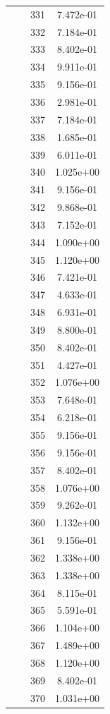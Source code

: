 \documentclass[12pt]{article}
\begin{document}
\begin{longtable}{@{}cccc@{}}
 &  & 331 & 7.472e-01 \\
 &  & 332 & 7.184e-01 \\
 &  & 333 & 8.402e-01 \\
 &  & 334 & 9.911e-01 \\
 &  & 335 & 9.156e-01 \\
 &  & 336 & 2.981e-01 \\
 &  & 337 & 7.184e-01 \\
 &  & 338 & 1.685e-01 \\
 &  & 339 & 6.011e-01 \\
 &  & 340 & 1.025e+00 \\
 &  & 341 & 9.156e-01 \\
 &  & 342 & 9.868e-01 \\
 &  & 343 & 7.152e-01 \\
 &  & 344 & 1.090e+00 \\
 &  & 345 & 1.120e+00 \\
 &  & 346 & 7.421e-01 \\
 &  & 347 & 4.633e-01 \\
 &  & 348 & 6.931e-01 \\
 &  & 349 & 8.800e-01 \\
 &  & 350 & 8.402e-01 \\
 &  & 351 & 4.427e-01 \\
 &  & 352 & 1.076e+00 \\
 &  & 353 & 7.648e-01 \\
 &  & 354 & 6.218e-01 \\
 &  & 355 & 9.156e-01 \\
 &  & 356 & 9.156e-01 \\
 &  & 357 & 8.402e-01 \\
 &  & 358 & 1.076e+00 \\
 &  & 359 & 9.262e-01 \\
 &  & 360 & 1.132e+00 \\
 &  & 361 & 9.156e-01 \\
 &  & 362 & 1.338e+00 \\
 &  & 363 & 1.338e+00 \\
 &  & 364 & 8.115e-01 \\
 &  & 365 & 5.591e-01 \\
 &  & 366 & 1.104e+00 \\
 &  & 367 & 1.489e+00 \\
 &  & 368 & 1.120e+00 \\
 &  & 369 & 8.402e-01 \\
 &  & 370 & 1.031e+00 \\

\end{longtable}
\end{document}
